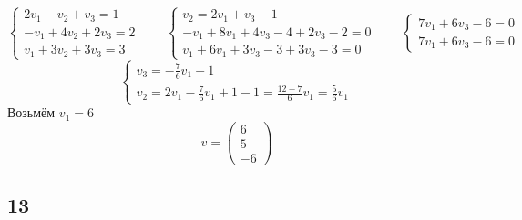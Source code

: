 $$
\begin{cases}
	2v_1 - v_2 + v_3 = 1 \\
    -v_1 + 4v_2 + 2v_3 = 2 \\
    v_1 + 3v_2 + 3v_3 = 3
\end{cases} \qquad
\begin{cases}
	v_2 = 2v_1 + v_3 - 1 \\
    -v_1 + 8v_1 + 4v_3 - 4 + 2v_3 - 2 = 0 \\
    v_1 + 6v_1 + 3v_3 - 3 + 3v_3 - 3 = 0
\end{cases} \qquad
\begin{cases}
	7v_1 + 6v_3 - 6 = 0 \\
    7v_1 + 6v_3 - 6 = 0
\end{cases} $$
$$
\begin{cases}
    v_3 = -\frac76v_1 + 1 \\
    v_2 = 2v_1 - \frac76v_1 + 1 - 1 = \frac{12 - 7}6v_1 = \frac56v_1
\end{cases} $$
Возьмём $ v_1 = 6 $
$$ v =
\begin{pmatrix}
	6 \\
    5 \\
    -6
\end{pmatrix} $$

\subsection{13}

